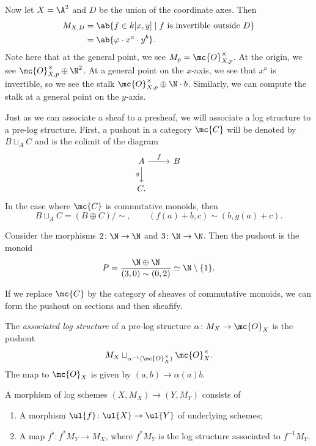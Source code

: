 \begin{exm}
    Now let \(X = \A^2\) and \(D\) be the union of the coordinate axes. Then
    \begin{align*}
        M_{X,D} &= \ab\{f \in k[x,y] \mid f \text{ is invertible outside } D \} \\
        &= \ab\{\varphi \cdot x^a \cdot y^b\}.
    \end{align*}
    Note here that at the general point, we see \(M_p = \mc{O}_{X,p}^{\times}\). At the origin, we see \(\mc{O}_{X,p}^{\times}\oplus \N^2\). At a general point on the \(x\)-axis, we see that \(x^a\) is invertible, so we see the stalk \(\mc{O}_{X,p}^{\times}\oplus \N \cdot b\). Similarly, we can compute the stalk at a general point on the \(y\)-axis.   
\end{exm}

Just as we can associate a sheaf to a presheaf, we will associate a log structure to a pre-log structure. First, a pushout in a category \(\mc{C}\) will be denoted by \(B \sqcup_A C\) and is the colimit of the diagram
\begin{equation*}
\begin{tikzcd}
    A \ar{r}{f} \ar{d}[swap]{g} & B \\
    C.
\end{tikzcd}
\end{equation*}
In the case where \(\mc{C}\) is commutative monoids, then
\[ B \sqcup_A C = (B \oplus C)/\sim, \qquad (f(a) + b, c) \sim (b, g(a)+c). \]

\begin{exm}
    Consider the morphisms \(2 \colon \N \to \N\) and \(3 \colon \N \to \N\). Then the pushout is the monoid
    \[ P = \frac{\N \oplus \N}{(3, 0) \sim (0,2)} \simeq \N \setminus \{1\}. \]
\end{exm}

If we replace \(\mc{C}\) by the category of sheaves of commutative monoids, we can form the pushout on sections and then sheafify.

\begin{defn}
    The \textit{associated log structure} of a pre-log structure \(\alpha \colon M_X \to \mc{O}_X\) is the pushout 
    \[ M_X \sqcup_{\alpha^{-1}(\mc{O}_X^{\times})} \mc{O}_X^{\times}. \]
    The map to \(\mc{O}_X\) is given by \((a,b) \to \alpha(a) b\). 
\end{defn}

\begin{defn}
    A morphism of log schemes \((X, M_X) \to (Y, M_Y)\) consists of
    \begin{enumerate}
        \item A morphism \(\ul{f} \colon \ul{X} \to \ul{Y}\) of underlying schemes;
        \item A map \(f^{\flat} \colon f^* M_Y \to M_X\), where \(f^* M_Y\) is the log structure associated to \(f^{-1} M_Y\).  
    \end{enumerate}
\end{defn}

